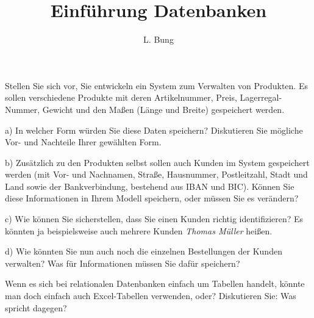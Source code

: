 \documentclass[11pt, a4paper, oneside]{article}
\begin{document}
	\author{L. Bung}
	\title{Einführung Datenbanken}
	\subject{SAE}
	\maketitle
	
	
	Stellen Sie sich vor, Sie entwickeln ein System zum Verwalten von Produkten.
	Es sollen verschiedene Produkte mit deren Artikelnummer, Preis, Lagerregal-Nummer, Gewicht und den Maßen (Länge und Breite) gespeichert werden.
	
	a) In welcher Form würden Sie diese Daten speichern?
	Diskutieren Sie mögliche Vor- und Nachteile Ihrer gewählten Form.
	
	\boxarea[6cm]
	
	b) Zusätzlich zu den Produkten selbst sollen auch Kunden im System gespeichert werden (mit Vor- und Nachnamen, Straße, Hausnummer, Postleitzahl, Stadt und Land sowie der Bankverbindung, bestehend aus IBAN und BIC).
	Können Sie diese Informationen in Ihrem Modell speichern, oder müssen Sie es verändern?
	
	\boxarea[6cm]
	
	c) Wie können Sie sicherstellen, dass Sie einen Kunden richtig identifizieren?
	Es könnten ja beispielsweise auch mehrere Kunden \emph{Thomas Müller} heißen.
	
	\boxarea[3cm]
	
	d) Wie könnten Sie nun auch noch die einzelnen Bestellungen der Kunden verwalten?
	Was für Informationen müssen Sie dafür speichern?
	
	\boxarea[3cm]
	
	
	
	Wenn es sich bei relationalen Datenbanken einfach um Tabellen handelt, könnte man doch einfach auch Excel-Tabellen verwenden, oder?
	Diskutieren Sie: Was spricht dagegen?
	
	\boxarea[6cm]
	
\end{document}
